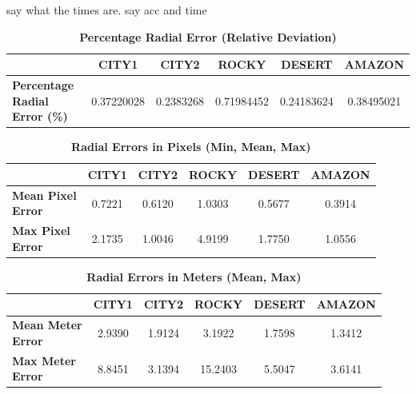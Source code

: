 say what the times are. say acc and time 



\begin{table}[H]
    \centering
    \caption{\textbf{Percentage Radial Error (Relative Deviation)}}
    \label{tab:percentage_radial_error}
    \begin{tabular}{|l|c|c|c|c|c|}
    \hline
    & \textbf{CITY1} & \textbf{CITY2} & \textbf{ROCKY} & \textbf{DESERT} & \textbf{AMAZON} \\
    \hline
    \makecell{\textbf{Percentage} \\ \textbf{Radial Error (\%)}} & 0.37220028 & 0.2383268 & 0.71984452 & 0.24183624 & 0.38495021 \\
    \hline
    \end{tabular}
\end{table}


\begin{table}[H]
\centering
\caption{\textbf{Radial Errors in Pixels (Min, Mean, Max)}}
\label{tab:radial_errors_pixels}
\begin{tabular}{|l|c|c|c|c|c|}
\hline
& \textbf{CITY1} & \textbf{CITY2} & \textbf{ROCKY} & \textbf{DESERT} & \textbf{AMAZON} \\
\hline
\makecell{\textbf{Mean Pixel} \\ \textbf{Error}} & 0.7221 & 0.6120 & 1.0303 & 0.5677 & 0.3914 \\
\hline
\makecell{\textbf{Max Pixel} \\ \textbf{Error}} & 2.1735 & 1.0046 & 4.9199 & 1.7750 & 1.0556 \\
\hline
\end{tabular}
\end{table}


\begin{table}[H]
    \centering
    \caption{\textbf{Radial Errors in Meters (Mean, Max)}}
    \label{tab:radial_errors_meters}
    \begin{tabular}{|l|c|c|c|c|c|}
    \hline
    & \textbf{CITY1} & \textbf{CITY2} & \textbf{ROCKY} & \textbf{DESERT} & \textbf{AMAZON} \\
    \hline
    \makecell{\textbf{Mean Meter} \\ \textbf{Error}} & 
        2.9390 & 
        1.9124 & 
        3.1922 & 
        1.7598 & 
        1.3412 \\
    \hline
    \makecell{\textbf{Max Meter} \\ \textbf{Error}} & 
        8.8451 & 
        3.1394 & 
        15.2403 & 
        5.5047 & 
        3.6141 \\
    \hline
    \end{tabular}
    \end{table}
    

